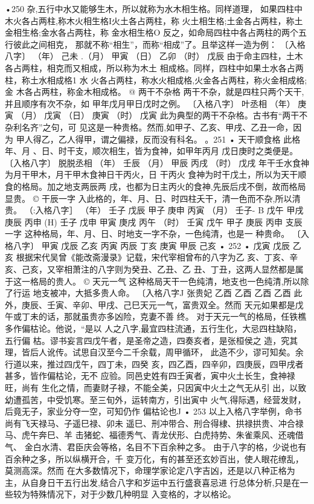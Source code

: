 •250
杂,五行中水又能够生木，所以就称为水木相生格。同样道理，
如果四柱中木火各占两柱,称木火相生格I火土各占两柱，称
火土相生格;土金各占两柱，称土金相生格;金水各占两柱，称
金水相生格O
反之，如命局四柱中各占两柱的两个五行彼此之间相克，
那就不称“相生”，而称“相成”了。且举这样一造为例：
〔入格八字〕
（年） 己未
.（月） 甲寅
（日） 乙卯
（时） 戊辰
由于命主四柱，土木各占两柱，相克而又相成，所以称为木土
相成格。同样，四柱中如果土水各占两柱，称土水相成格1 水
火各占两柱，称水火相成格,火金各占两柱，称火金相成格;金
木各占两柱，称金木相成格。
@ 两干不杂格
两干不杂，就是四柱只两个天干,并且顺序有次不杂，如
甲年戊月甲日戊时之例。
〔入格八字〕 叶丞相
（年） 庚寅
（月） 戊寅
（日） 庚寅
（时） 戊寅
此为典型的两干不杂格。古书有“两干不杂利名齐”之句，可
见这是一种贵格。然而,如甲子、乙亥、甲戌、乙丑一命，因为
甲人得乙，乙人得甲，谓之偏禄，反而没有科名。
。251 •
天干顺食格
此格年、月 、日、时干支，顺次相生，皆为食神，如甲年丙月
戊日庚时之类便是。
〔入格八字〕 脱脱丞相
（年） 壬辰
（月） 甲辰
丙戌
（时） 戊戌
年干壬水食神为月干甲木，月干甲木食神日干丙火，日 干丙火
食神为时干戊土，所以为天干顺食的格局。加之地支两辰两
戌，也都为日主丙火的食神,先辰后戌不倒，故而格局显贵。
© 干辰一字
入此格的，年、月、日、时四柱夭干，清一色而不杂,所以清
贵。
（:入格八字］
（年） 壬子 戊辰 甲子 庚申 丙寅
（月） 壬子- B
戊午 甲戌 庚辰 丙申
(H) 壬子 戊申 甲寅 庚戌 丙午
（时） 壬寅 戊午 甲子 庚辰 丙申
支辰一字
这种格局，年、月、日、时地支一字不杂，一色纯清，也是一
种贵命。
〔入格八字〕
甲寅 戊辰 乙亥
丙寅 丙辰 丁亥
庚寅 甲辰 己亥
• 252 •
戊寅 戊辰 乙亥
根据宋代吴曾《能改斋漫录》记载，宋代宰相曾布的八字为乙
亥、丁亥、辛亥、己亥，又宰相萧注的八字则为癸丑、乙丑、乙
丑、丁丑，这两人显然都是属于这一格局的贵人。
© 天元一气
这种格局天干一色纯清，地支也一色纯清,所以除了行运
地支被冲，大抵多贵人命。
〔入格八字J 张贵妃
乙酉
乙酉
乙酉
乙酉
此外，庚辰、壬寅、辛卯、甲戌、己巳天元一气，富贵双全。然而
天元如果都是戊午或丁未的话，那就虽贵亦多凶险，克妻不善
终。
对于天元一气的格局，任铁樵多作偏枯论。他说，“是以
人之八字,最宜四柱流通，五行生化，大忌四柱缺陷，五行偏
枯。谬书妄言四戊午者，是圣帝之造，四奏亥者，是张桓侯之
造，究其理，皆后人讹传。试思自汉至今二千余载，周甲循环，
此造不少，谬可知矣。余行道以来，推过四戊午，四丁未，四癸
亥，四乙酉，四辛卯，四庚辰，四甲戌者甚多，皆作偏枯论，无不
应验。同邑史姓有四壬寅者，寅中火土长生，食神禄旺，尚有
生化之情，而妻财子禄，不能全美，只因寅中火土之气无从引
出，以致幼遭孤苦，中受饥寒。至三旬外，运转南方，引出寅中
火气,得际遇，经营发财，后竟无子，家业分夺一空，可知仍作
偏枯论也J
• 253 
以上入格八字举例，命书尚有飞天禄马、子遥巳禄、卯未
遥巳、刑冲带合、刑合得棣、拱禄拱贵、冲合禄马、虎午奔巳、羊
击猪蛇、福德秀气、青龙伏形、白虎持势、朱雀乘风、还魂借气、
金白水清、君臣庆会等格，名目不下百余种之多。
由于八字的格，少说也有百余种之多，所以纵横开合，千
变万化，有的甚至还玄妙百出，使人眼花缭乱，莫测高深。然而
在大多数情况下，命理学家论定八字吉凶，还是以八种正格为
主，从自身日干五行出发,结合八字和岁运中五行盛衰喜忌进
行总体分析,只是在一些较为特殊情况下，对于少数几种明显
入变格的，才以格论。

